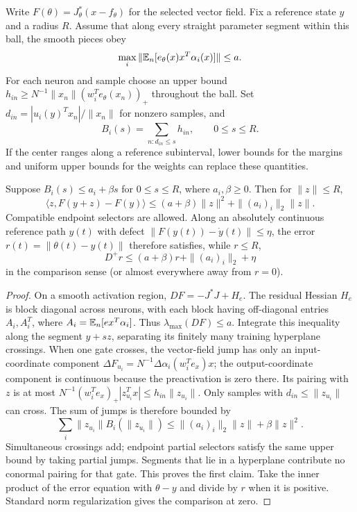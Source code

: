 Write $F(\theta)=J_\theta^*(x-f_\theta)$ for the selected vector field.
Fix a reference state $y$ and a radius $R$. Assume that along every straight
parameter segment within this ball, the smooth pieces obey
\[
 \max_i\|\mathbb E_n[e_\theta(x)x^T\alpha_i(x)]\|\le a.
\]
For each neuron and sample choose an upper bound
$h_{in}\ge N^{-1}\|x_n\|(w_i^Te_\theta(x_n))_+$ throughout the ball.
Set $d_{in}=|u_i(y)^Tx_n|/\|x_n\|$ for nonzero samples, and
\[
 B_i(s)=\sum_{n:d_{in}\le s}h_{in},\qquad 0\le s\le R.
\]
If the center ranges along a reference subinterval, lower bounds for the
margins and uniform upper bounds for the weights can replace these quantities.

\begin{lemma}\label{initcert:tube}
Suppose $B_i(s)\le a_i+\beta s$ for $0\le s\le R$, where $a_i,\beta\ge0$.
Then for $\|z\|\le R$,
\[
 \langle z,F(y+z)-F(y)\rangle
 \le(a+\beta)\|z\|^2+\|(a_i)_i\|_2\|z\|.
\]
Compatible endpoint selectors are allowed. Along an absolutely continuous
reference path $y(t)$ with defect $\|F(y(t))-\dot y(t)\|\le\eta$, the
error $r(t)=\|\theta(t)-y(t)\|$ therefore satisfies, while $r\le R$,
\[
 D^+r\le(a+\beta)r+\|(a_i)_i\|_2+\eta
\]
in the comparison sense (or almost everywhere away from $r=0$).
\end{lemma}
\begin{proof}
On a smooth activation region,
$DF=-J^*J+H_e$. The residual Hessian $H_e$ is block diagonal across
neurons, with each block having off-diagonal entries $A_i,A_i^T$, where
$A_i=\mathbb E_n[e x^T\alpha_i]$. Thus $\lambda_{\max}(DF)\le a$.
Integrate this inequality along the segment $y+sz$, separating its finitely
many training hyperplane crossings. When one gate crosses, the vector-field
jump has only an input-coordinate component
$\Delta F_{u_i}=N^{-1}\Delta\alpha_i(w_i^Te_x)x$; the output-coordinate
component is continuous because the preactivation is zero there. Its pairing
with $z$ is at most
$N^{-1}(w_i^Te_x)_+|z_{u_i}^Tx|\le h_{in}\|z_{u_i}\|$.
Only samples with $d_{in}\le\|z_{u_i}\|$ can cross. The sum of jumps is
therefore bounded by
\[
 \sum_i\|z_{u_i}\|B_i(\|z_{u_i}\|)
 \le\|(a_i)_i\|_2\|z\|+\beta\|z\|^2.
\]
Simultaneous crossings add; endpoint partial selectors satisfy the same
upper bound by taking partial jumps. Segments that lie in a hyperplane
contribute no conormal pairing for that gate. This proves the first claim.
Take the inner product of the error equation with $\theta-y$ and divide
by $r$ when it is positive. Standard norm regularization gives the comparison
at zero.
\end{proof}

